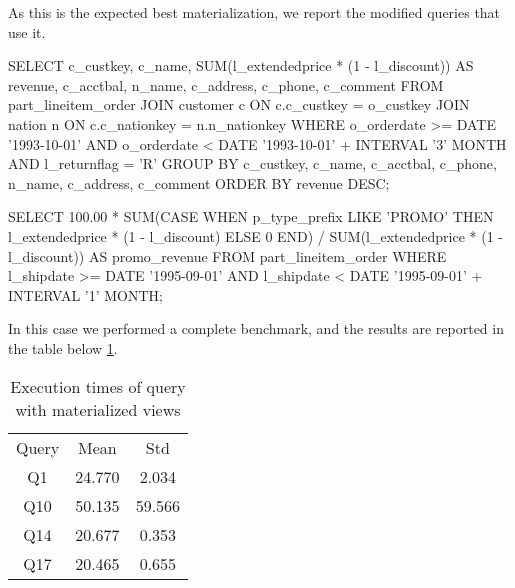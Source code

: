 As this is the expected best materialization, we report the modified queries that use it.

\begin{sql}[Query 10]
SELECT
    c_custkey,
    c_name,
    SUM(l_extendedprice * (1 - l_discount)) AS revenue,
    c_acctbal,
    n_name,
    c_address,
    c_phone,
    c_comment
FROM
    part_lineitem_order
    JOIN customer c ON c.c_custkey = o_custkey
    JOIN nation n ON c.c_nationkey = n.n_nationkey
WHERE
    o_orderdate >= DATE '1993-10-01'
    AND o_orderdate < DATE '1993-10-01' + INTERVAL '3' MONTH
    AND l_returnflag = 'R'
GROUP BY
    c_custkey,
    c_name,
    c_acctbal,
    c_phone,
    n_name,
    c_address,
    c_comment
ORDER BY
    revenue DESC;
\end{sql}

\begin{sql}[Query 14]
SELECT
    100.00 * SUM(CASE
        WHEN p_type_prefix LIKE 'PROMO'
        THEN l_extendedprice * (1 - l_discount)
        ELSE 0
    END) / SUM(l_extendedprice * (1 - l_discount)) AS promo_revenue
FROM
    part_lineitem_order
WHERE
    l_shipdate >= DATE '1995-09-01'
    AND l_shipdate < DATE '1995-09-01' + INTERVAL '1' MONTH;
\end{sql}


In this case we performed a complete benchmark, and the results are reported in the table below \ref{tab:materialize}.

\begin{table}[H]
\centering 
\begin{tabular}{c|c|c} 
\rowcolor{blue!50} Query & Mean & Std\\
\rowcolor{gray!10} Q1 &24.770 &2.034\\
\rowcolor{white} Q10 &50.135 &59.566\\
\rowcolor{gray!10} Q14 &20.677 &0.353\\
\rowcolor{white} Q17 &20.465 &0.655\\
\end{tabular}\\[0.5cm] 
\caption{Execution times of query with materialized views} 
\label{tab:materialize} 
\end{table}

